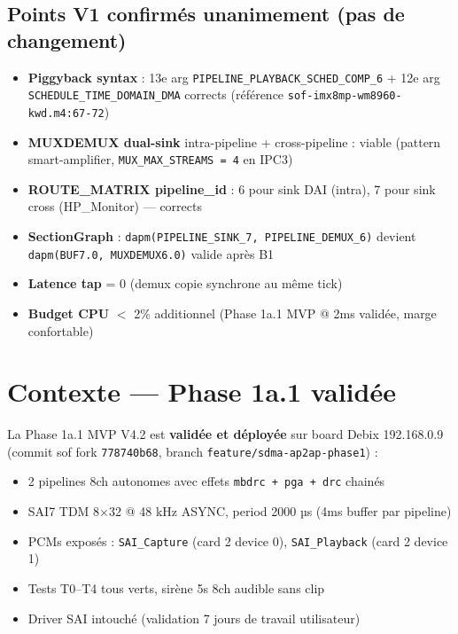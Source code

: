 \documentclass[11pt,a4paper]{article}
\begin{document}
\subsection{Points V1 confirmés unanimement (pas de changement)}

\begin{itemize}[leftmargin=*, itemsep=1pt]
  \item \textbf{Piggyback syntax} : 13e arg \texttt{PIPELINE\_PLAYBACK\_SCHED\_COMP\_6} + 12e arg \texttt{SCHEDULE\_TIME\_DOMAIN\_DMA} corrects (référence \texttt{sof-imx8mp-wm8960-kwd.m4:67-72})
  \item \textbf{MUXDEMUX dual-sink} intra-pipeline + cross-pipeline : viable (pattern smart-amplifier, \texttt{MUX\_MAX\_STREAMS = 4} en IPC3)
  \item \textbf{ROUTE\_MATRIX pipeline\_id} : 6 pour sink DAI (intra), 7 pour sink cross (HP\_Monitor) — corrects
  \item \textbf{SectionGraph} : \texttt{dapm(PIPELINE\_SINK\_7, PIPELINE\_DEMUX\_6)} devient \texttt{dapm(BUF7.0, MUXDEMUX6.0)} valide après B1
  \item \textbf{Latence tap} = 0 (demux copie synchrone au même tick)
  \item \textbf{Budget CPU} $<$ 2\% additionnel (Phase 1a.1 MVP @ 2ms validée, marge confortable)
\end{itemize}

\section{Contexte — Phase 1a.1 validée}

La Phase 1a.1 MVP V4.2 est \textbf{validée et déployée} sur board Debix 192.168.0.9 (commit sof fork \texttt{778740b68}, branch \texttt{feature/sdma-ap2ap-phase1}) :

\begin{itemize}[leftmargin=*, itemsep=1pt]
  \item 2 pipelines 8ch autonomes avec effets \texttt{mbdrc + pga + drc} chainés
  \item SAI7 TDM 8$\times$32 @ 48 kHz ASYNC, period 2000 µs (4ms buffer par pipeline)
  \item PCMs exposés : \texttt{SAI\_Capture} (card 2 device 0), \texttt{SAI\_Playback} (card 2 device 1)
  \item Tests T0--T4 tous verts, sirène 5s 8ch audible sans clip
  \item Driver SAI intouché (validation 7 jours de travail utilisateur)
\end{itemize}
\end{document}
